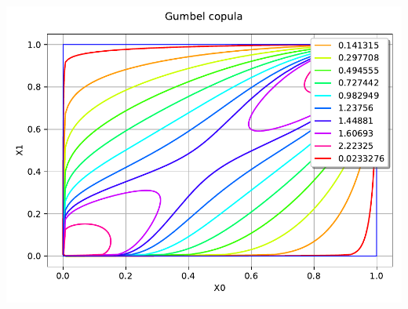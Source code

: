\documentclass[aspectratio=169]{beamer}
\begin{document}
\begin{frame}[containsverbatim]
\begin{minipage}[t]{0.5\textwidth}
\end{minipage}%
\begin{minipage}[t]{0.5\textwidth}
    \includegraphics[width=.65\textwidth]{figures/Copula4.pdf}

\end{minipage}

\end{frame}


\end{document}
